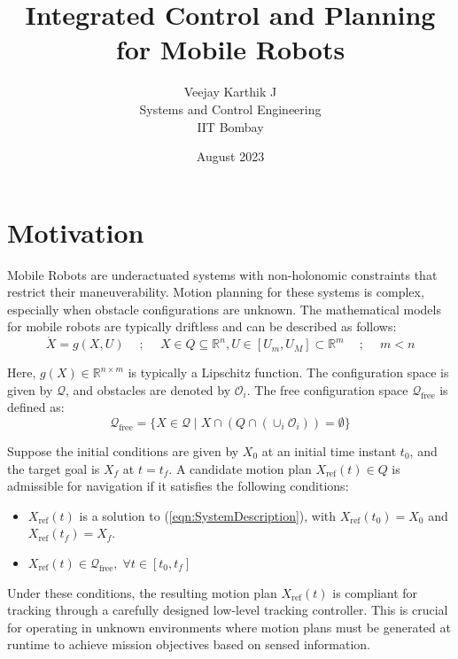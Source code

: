 \documentclass{article}
\title{Integrated Control and Planning for Mobile Robots}
\author{Veejay Karthik J\\ Systems and Control Engineering\\ IIT Bombay}
\date{August 2023}
\begin{document}
    \maketitle
    
    \section{Motivation}
    
    Mobile Robots are underactuated systems with non-holonomic constraints that restrict their maneuverability. Motion planning for these systems is complex, especially when obstacle configurations are unknown. The mathematical models for mobile robots are typically driftless and can be described as follows:
    \begin{equation}
    \dot{X} = g(X,U) \quad~;~\quad X \in Q \subseteq \mathbb{R}^n, U\in [U_m,U_M]\subset\mathbb{R}^m \quad~;~\quad m < n
    \label{eqn:SystemDescription}
    \end{equation}
    
    Here, $g(X)\in \mathbb{R}^{n\times m}$ is typically a Lipschitz function. The configuration space is given by $\mathcal{Q}$, and obstacles are denoted by $\mathcal{O}_i$. The free configuration space $\mathcal{Q}_{\text{free}}$ is defined as:
    \begin{equation}
    \mathcal{Q}_{\text{free}} = \{X\in\mathcal{Q}\;|\; X\cap\left(Q\cap (\cup_i \mathcal{O}_i)\right) = \emptyset \}
    \label{eqn:FreeWorkspaces}
    \end{equation}
    
    Suppose the initial conditions are given by $X_0$ at an initial time instant $t_0$, and the target goal is $X_f$ at $t=t_f$. A candidate motion plan $X_{\text{ref}}(t) \in Q$ is admissible for navigation if it satisfies the following conditions:
    \begin{itemize}
        \item $X_{\text{ref}}(t)$ is a solution to (\ref{eqn:SystemDescription}), with $X_{\text{ref}}(t_0) = X_0$ and $X_{\text{ref}}(t_f) = X_f$.
        \item $X_{\text{ref}}(t) \in \mathcal{Q}_{\text{free}},\; \forall t\in[t_0,t_f]$
    \end{itemize}
    
    Under these conditions, the resulting motion plan $X_{\text{ref}}(t)$ is compliant for tracking through a carefully designed low-level tracking controller. This is crucial for operating in unknown environments where motion plans must be generated at runtime to achieve mission objectives based on sensed information.
    
\end{document}
